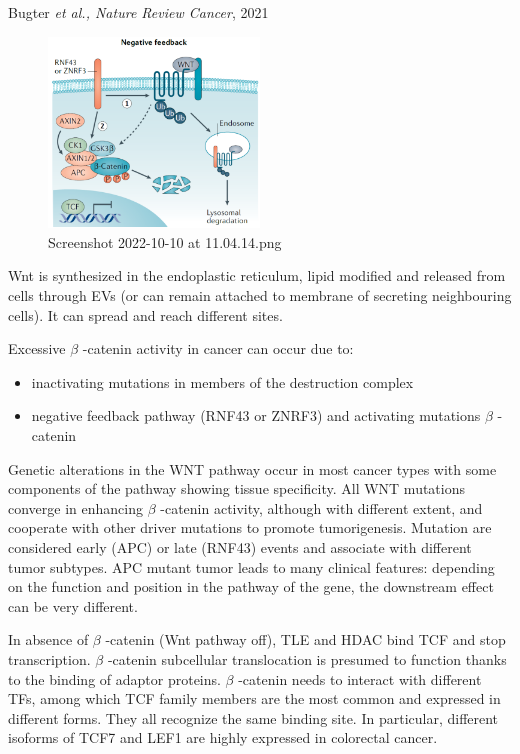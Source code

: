 Bugter \emph{et al., Nature Review Cancer}, 2021

\begin{figure}
\centering
\includegraphics[width=0.5\textwidth]{../_resources/Screenshot_2022-10-10_at_11-04-14.png}
\caption{Screenshot 2022-10-10 at 11.04.14.png}
\end{figure}

Wnt is synthesized in the endoplastic reticulum, lipid modified and released from cells through EVs (or can remain attached to membrane of secreting neighbouring cells). It can spread and reach different sites.

Excessive $\beta$  -catenin activity in cancer can occur due to:

\begin{itemize}
\tightlist
\item
  inactivating mutations in members of the destruction complex
\item
  negative feedback pathway (RNF43 or ZNRF3) and activating mutations $\beta$  -catenin
\end{itemize}

Genetic alterations in the WNT pathway occur in most cancer types with some components of the pathway showing tissue specificity. All WNT mutations converge in enhancing $\beta$  -catenin activity, although with different extent, and cooperate with other driver mutations to promote tumorigenesis. Mutation are considered early (APC) or late (RNF43) events and associate with different tumor subtypes. APC mutant tumor leads to many clinical features: depending on the function and position in the pathway of the gene, the downstream effect can be very different.

In absence of $\beta$  -catenin (Wnt pathway off), TLE and HDAC bind TCF and stop transcription. $\beta$  -catenin subcellular translocation is presumed to function thanks to the binding of adaptor proteins. $\beta$  -catenin needs to interact with different TFs, among which TCF family members are the most common and expressed in different forms. They all recognize the same binding site. In particular, different isoforms of TCF7 and LEF1 are highly expressed in colorectal cancer.

